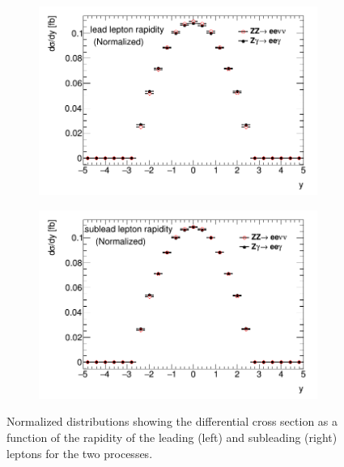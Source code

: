 \documentclass[11pt,a4paper,openright,twoside]{report}
\begin{document}
\begin{figure}[H]
\centering
	\begin{subfigure}{0.49\textwidth}
		\includegraphics[width=\linewidth]{leady.png}
		\caption{}
		\label{fig:leady}
	\end{subfigure}
	\begin{subfigure}{0.49\textwidth}
		\includegraphics[width=\linewidth]{subleady.png}
		\caption{}
		\label{fig:subleady}
	\end{subfigure}
	\caption{Normalized distributions showing the differential cross section as a function of the rapidity of the leading (left) and subleading (right) leptons for the two processes.}
	\label{fig:leptony}
\end{figure}
\end{document}
